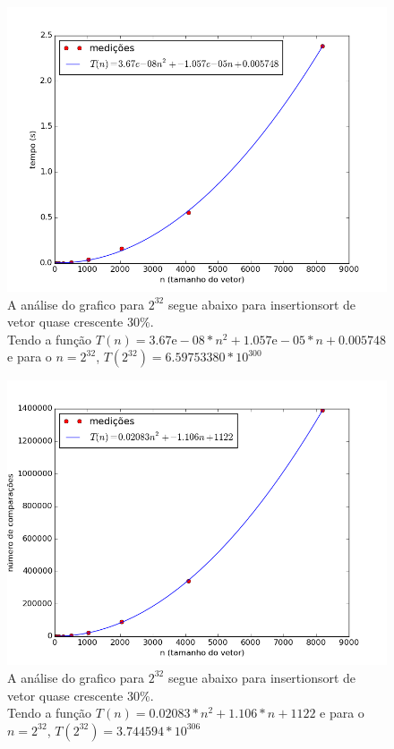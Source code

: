 \documentclass[12pt,a4paper,twoside]{report}
\begin{document}
\clearpage


\begin{figure}[ht]
\centering \includegraphics[scale=0.8]{../insertionsort/imagens/insertionsortQuaseCresc300.png}
\caption{A análise do grafico para $2^{32}$ segue abaixo para insertionsort de vetor quase crescente 30\%.\\
Tendo a função $T(n) = 3.67\mathrm{e}-08*n^2+1.057\mathrm{e}-05*n+0.005748$ e para o $n =2^{32}$, $T(2^{32}) = 6.59753380 * 10^{300}$}
\label{fig:insertionsortQuaseCresc300}
\end{figure}

\begin{figure}[ht]
\centering \includegraphics[scale=0.8]{../insertionsort/imagens/insertionsortQuaseCresc301.png}
\caption{A análise do grafico para $2^{32}$ segue abaixo para insertionsort de vetor quase crescente 30\%.\\
Tendo a função $T(n) = 0.02083*n^2+1.106*n+1122$ e para o $n =2^{32}$, $T(2^{32}) = 3.744594 * 10^{306}$}
\label{fig:insertionsortQuaseCresc301}
\end{figure}
\end{document}
